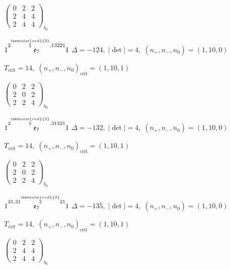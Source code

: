 \documentclass[10pt]{article}
\begin{document}
\hspace{2em}$\left(\begin{smallmatrix}0 & 2 & 2 \\ 2 & 4 & 4 \\ 2 & 4 & 4\end{smallmatrix}\right)_{\!b_0}$

\smallskip

$1\overset{2\overset{\textcolor{red}{2}}{1},13221}{\mathfrak{e}_7}1$ \quad $\Delta=-124,\; |\det|=4,\; (n_+,n_-,n_0)=(1,10,0)$

\hspace{1em}$T_{\text{crit}}=14,\; (n_+,n_-,n_0)_{\text{crit}}=(1,10,1)$

\hspace{2em}$\left(\begin{smallmatrix}0 & 2 & 2 \\ 2 & 0 & 2 \\ 2 & 2 & 4\end{smallmatrix}\right)_{\!b_0}$

\smallskip

$1\overset{2\overset{\textcolor{red}{2}}{1},31321}{\mathfrak{e}_7}1$ \quad $\Delta=-132,\; |\det|=4,\; (n_+,n_-,n_0)=(1,10,0)$

\hspace{1em}$T_{\text{crit}}=14,\; (n_+,n_-,n_0)_{\text{crit}}=(1,10,1)$

\hspace{2em}$\left(\begin{smallmatrix}0 & 2 & 2 \\ 2 & 0 & 2 \\ 2 & 2 & 4\end{smallmatrix}\right)_{\!b_0}$

$1\overset{21,31\overset{\textcolor{red}{2}}{3}21}{\mathfrak{e}_7}1$ \quad $\Delta=-135,\; |\det|=4,\; (n_+,n_-,n_0)=(1,10,0)$

\hspace{1em}$T_{\text{crit}}=14,\; (n_+,n_-,n_0)_{\text{crit}}=(1,10,1)$

\hspace{2em}$\left(\begin{smallmatrix}0 & 2 & 2 \\ 2 & 4 & 4 \\ 2 & 4 & 4\end{smallmatrix}\right)_{\!b_0}$
\end{document}
